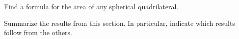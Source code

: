 \documentclass[newpage,hints,12pt,handout,nooutcomes,noauthor]{ximera}
\begin{document}
\begin{problem}
Find a formula for the area of any spherical quadrilateral.

\end{problem}


\begin{problem}
Summarize the results from this section. In particular, indicate which
results follow from the others.
\begin{freeResponse}
\end{freeResponse}
\end{problem}
\end{document}
